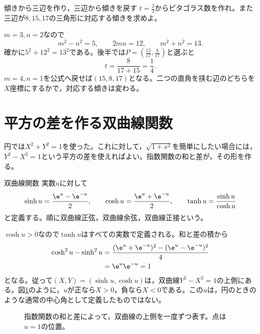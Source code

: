 \begin{example}{傾きから三辺を作り，三辺から傾きを戻す}
$t=\frac23$からピタゴラス数を作れ。また三辺が$8,15,17$の三角形に対応する傾きを求めよ。
\end{example}

$m=3,n=2$なので
\[
m^2-n^2=5,\qquad2mn=12,\qquad m^2+n^2=13.
\]
確かに$5^2+12^2=13^2$である。後半では$P=\left(\frac{15}{17},\frac8{17}\right)$と選ぶと
\[
t=\frac8{17+15}=\frac14.
\]
$m=4,n=1$を公式へ戻せば$(15,8,17)$となる。二つの直角を挟む辺のどちらを$X$座標にするかで，対応する傾きは変わる。

\section{平方の差を作る双曲線関数}\label{節:双曲線関数}

円では$X^2+Y^2=1$を使った。これに対して，$\sqrt{1+x^2}$を簡単にしたい場合には，$Y^2-X^2=1$という平方の差を使えればよい。指数関数の和と差が，その形を作る。

\begin{definition}{双曲線関数}
実数$u$に対して
\[
\sinh u=\frac{\e^u-\e^{-u}}2,\qquad
\cosh u=\frac{\e^u+\e^{-u}}2,\qquad
\tanh u=\frac{\sinh u}{\cosh u}
\]
と定義する。順に双曲線正弦，双曲線余弦，双曲線正接という。
\end{definition}

$\cosh u>0$なので$\tanh u$はすべての実数で定義される。和と差の積から
\[
\begin{aligned}
\cosh^2u-\sinh^2u
&=\frac{(\e^u+\e^{-u})^2-(\e^u-\e^{-u})^2}{4}\\
&=\e^u\e^{-u}=1
\end{aligned}
\]
となる。従って$(X,Y)=(\sinh u,\cosh u)$は，双曲線$Y^2-X^2=1$の上側にある。図\ref{図:双曲線の媒介表示}のように，$u$が正なら$X>0$，負なら$X<0$である。この$u$は，円のときのような通常の中心角として定義したものではない。

\begin{figure}[htbp]
\centering
{}
\caption{指数関数の和と差によって，双曲線の上側を一度ずつ表す。点は$u=1$の位置。}
\label{図:双曲線の媒介表示}
\end{figure}

